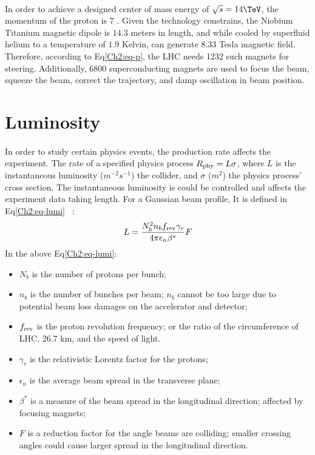 \paragraph{}
In order to achieve a designed center of mass energy of $\sqrt{s} = 14 \TeV$, the momentum of the proton is $7$ \TeV. Given the technology constrains, the Niobium Titanium magnetic dipole is $14.3$ meters in length, and while cooled by superfluid helium to a temperature of $1.9$ Kelvin, can generate $8.33$ Tesla magnetic field. Therefore, according to Eq\ref{Ch2:eq-p}, the LHC needs 1232 such magnets for steering. Additionally, 6800 superconducting magnets are used to focus the beam, squeeze the beam, correct the trajectory, and damp oscillation in beam position.


\section{Luminosity}
\paragraph{}
In order to study certain physics events, the production rate affects the experiment. The rate of a specified physics process $R_{\rm phy} = L\sigma$, where $L$ is the instantaneous luminosity ($m^{-2}s^{-1}$) the collider, and $\sigma$ ($m^2$) the physics process' cross section. The instantaneous luminosity is could be controlled and affects the experiment data taking length. For a Gaussian beam profile, It is defined in Eq\ref{Ch2:eq-lumi} ~\cite{LHCReview}:
%
\begin{equation}
\label{Ch2:eq-lumi}
L = \frac{N_b^2 n_b f_{\rm rev} \gamma_r}{4\pi \epsilon_n \beta^*} F
\end{equation}
%
In the above Eq\ref{Ch2:eq-lumi}:
\begin{itemize}
	\item $N_b$ is the number of protons per bunch; 
	\item $n_b$ is the number of bunches per beam; $n_b$ cannot be too large due to potential beam loss damages on the accelerator and detector; %
	\item $f_{\rm rev}$ is the proton revolution frequency; or the ratio of the circumference of LHC, 26.7 km, and the speed of light.
	\item $\gamma_r$ is the relativistic Lorentz factor for the protons;
	\item $\epsilon_n$ is the average beam spread in the transverse plane;
	\item $\beta^*$ is a measure of the beam spread in the longitudinal direction; affected by focusing magnets;
	\item $F$ is a reduction factor for the angle beams are colliding; smaller crossing angles could cause larger spread in the longitudinal direction.
\end{itemize}


